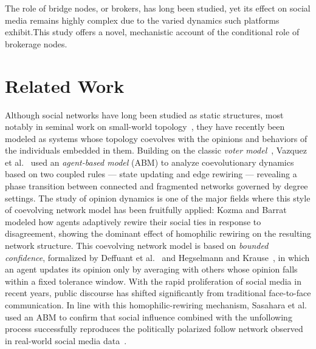 \documentclass{svproc}
\def\Blue{\color[rgb]{0,0,1}}
\def\Black{\color[rgb]{0,0,0}}
\begin{document}
\Black


The role of bridge nodes, or brokers, has long been studied, yet its
effect on social media remains highly complex due to the varied
dynamics such platforms exhibit.This study offers a novel, mechanistic
account of the conditional role of brokerage nodes.

\Blue

\section{Related Work}\label{sec:related}
Although social networks have long been studied as static structures,
most notably in seminal work on small-world topology~\cite{watts1998},
they have recently been modeled as systems whose topology coevolves
with the opinions and behaviors of the individuals embedded in
them. Building on the classic \emph{voter model}~\cite{clifford1973},
Vazquez et al.~\cite{vazquez2008} used an {\em agent-based model}
(ABM) to analyze coevolutionary dynamics based on two coupled rules
--- state updating and edge rewiring --- revealing a phase transition
between connected and fragmented networks governed by degree
settings. The study of opinion dynamics is one of the major fields
where this style of coevolving network model has been fruitfully
applied: Kozma and Barrat~\cite{kozma2008} modeled how agents
adaptively rewire their social ties in response to disagreement,
showing the dominant effect of homophilic rewiring on the resulting
network structure. This coevolving network model is based on {\em bounded
confidence}, formalized by Deffuant et al.~\cite{deffuant2000} and
Hegselmann and Krause~\cite{hegselmann2002}, in which an agent updates
its opinion only by averaging with others whose opinion falls within a
fixed tolerance window. With the rapid proliferation of social media
in recent years, public discourse has shifted significantly from
traditional face-to-face communication. In line with this
homophilic-rewiring mechanism, Sasahara et al.~\cite{sasahara2020}
used an ABM to confirm that social influence combined with the
unfollowing process successfully reproduces the politically polarized
follow network observed in real-world social media
data~\cite{conover2011}.
\par
\end{document}
